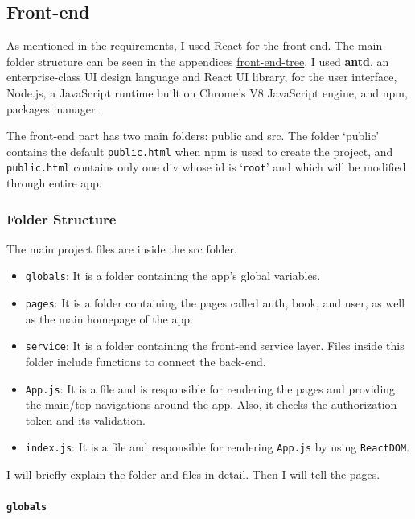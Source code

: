 \subsection{Front-end}

As mentioned in the requirements, I used React for the front-end. The main folder structure can be seen in the appendices \hyperref[front-end-tree]{front-end-tree}. I used \textbf{antd}, an enterprise-class UI design language and React UI library, for the user interface, Node.js, a JavaScript runtime built on Chrome's V8 JavaScript engine, and npm, packages manager.

The front-end part has two main folders: public and src. The folder `public' contains the default \texttt{public.html} when npm is used to create the project, and \texttt{public.html} contains only one div whose id is `\texttt{root}' and which will be modified through entire app. 

\subsubsection{Folder Structure}

The main project files are inside the src folder.
\begin{itemize}
  \item \texttt{globals}: It is a folder containing the app's global variables.
  \item \texttt{pages}: It is a folder containing the pages called auth, book, and user, as well as the main homepage of the app.
  \item \texttt{service}: It is a folder containing the front-end service layer. Files inside this folder include functions to connect the back-end.
  \item \texttt{App.js}: It is a file and is responsible for rendering the pages and providing the main/top navigations around the app. Also, it checks the authorization token and its validation.
  \item \texttt{index.js}: It is a file and responsible for rendering \texttt{App.js} by using \texttt{ReactDOM}.
\end{itemize}

I will briefly explain the folder and files in detail. Then I will tell the pages.

\paragraph{\texttt{globals}}

